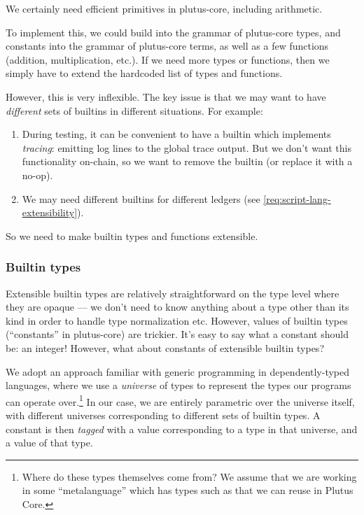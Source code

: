 We certainly need efficient primitives in \gls{plutus-core}, including arithmetic.

To implement this, we could build  into the grammar of \gls{plutus-core} types, and  constants into the grammar of \gls{plutus-core} terms, as well as a few functions (addition, multiplication, etc.).
If we need more types or functions, then we simply have to extend the hardcoded list of types and functions.

However, this is very inflexible.
The key issue is that we may want to have \emph{different} sets of builtins in different situations.
For example:
\begin{enumerate}
\item
  During testing, it can be convenient to have a builtin which implements \emph{tracing}: emitting log lines to the global trace output.
  But we don't want this functionality on-chain, so we want to remove the builtin (or replace it with a no-op).
\item
  We may need different builtins for different ledgers (see \cref{req:script-lang-extensibility}).
\end{enumerate}

So we need to make builtin types and functions extensible.

\subsubsection{Builtin types}

Extensible builtin types are relatively straightforward on the type level where they are opaque --- we don't need to know anything about a type other than its kind in order to handle type normalization etc.
However, values of builtin types (``constants'' in \gls{plutus-core}) are trickier.
It's easy to say what a  constant should be: an integer!
However, what about constants of extensible builtin types?

We adopt an approach familiar with generic programming in dependently-typed languages, where we use a \emph{universe} of types to represent the types our programs can operate over.\footnote{
  Where do these types themselves come from?
  We assume that we are working in some ``metalanguage'' which has types such as  that we can reuse in Plutus Core.
}
In our case, we are entirely parametric over the universe itself, with different universes corresponding to different sets of builtin types.
A constant is then \emph{tagged} with a value corresponding to a type in that universe, and a value of that type.

